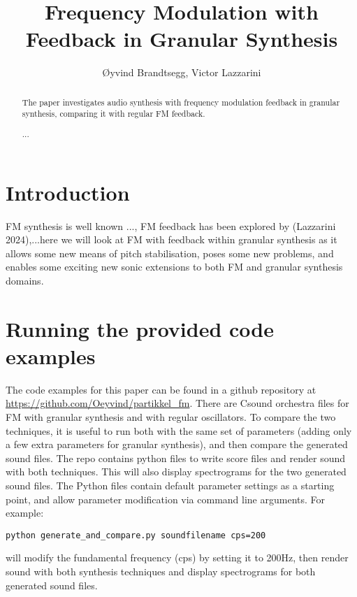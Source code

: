 \documentclass[runningheads,a4paper]{llncs}
\newcommand{\keywords}[1]{\par\addvspace\baselineskip
\noindent\keywordname\enspace\ignorespaces#1}
\begin{document}
\mainmatter  %

\title{Frequency Modulation with Feedback in Granular Synthesis}




\author{Øyvind Brandtsegg, Victor Lazzarini}
%




\maketitle

\begin{abstract}

The paper investigates audio synthesis with frequency modulation feedback in granular synthesis, comparing it with regular FM feedback. 

\keywords{...}
\end{abstract}


\section{Introduction}
FM synthesis is well known ..., FM feedback has been explored by (Lazzarini 2024),...here we will look at FM with feedback within granular synthesis as it allows some new means of pitch stabilisation, poses some new problems, and enables some exciting new sonic extensions to both FM and granular synthesis domains.

\section{Running the provided code examples}
The code examples for this paper can be found in a github repository at \url{https://github.com/Oeyvind/partikkel_fm}. There are Csound orchestra files for FM with granular synthesis and with regular oscillators. To compare the two techniques, it is useful to run both with the same set of parameters (adding only a few extra parameters for granular synthesis), and then compare the generated sound files. The repo contains python files to write score files and render sound with both techniques. This will also display spectrograms for the two generated sound files. The Python files contain default parameter settings as a starting point, and allow parameter modification via command line arguments. For example:
\begin{verbatim}
python generate_and_compare.py soundfilename cps=200
\end{verbatim}
will modify the fundamental frequency (cps) by setting it to 200Hz, then render sound with both synthesis techniques and display spectrograms for both generated sound files. 
\end{document}
